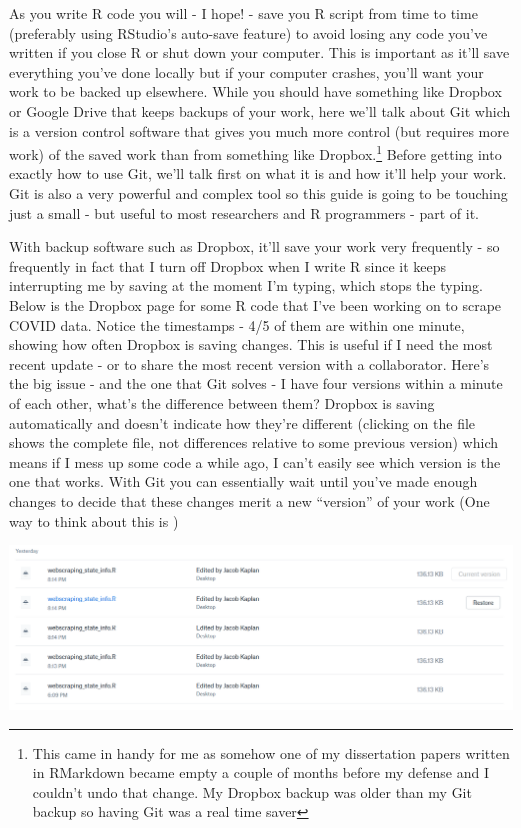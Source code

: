\documentclass[
  12pt,
]{book}
\begin{document}
As you write R code you will - I hope! - save you R script from time to time (preferably using RStudio's auto-save feature) to avoid losing any code you've written if you close R or shut down your computer. This is important as it'll save everything you've done locally but if your computer crashes, you'll want your work to be backed up elsewhere. While you should have something like Dropbox or Google Drive that keeps backups of your work, here we'll talk about Git which is a version control software that gives you much more control (but requires more work) of the saved work than from something like Dropbox.\footnote{This came in handy for me as somehow one of my dissertation papers written in RMarkdown became empty a couple of months before my defense and I couldn't undo that change. My Dropbox backup was older than my Git backup so having Git was a real time saver} Before getting into exactly how to use Git, we'll talk first on what it is and how it'll help your work. Git is also a very powerful and complex tool so this guide is going to be touching just a small - but useful to most researchers and R programmers - part of it.

With backup software such as Dropbox, it'll save your work very frequently - so frequently in fact that I turn off Dropbox when I write R since it keeps interrupting me by saving at the moment I'm typing, which stops the typing. Below is the Dropbox page for some R code that I've been working on to scrape COVID data. Notice the timestamps - 4/5 of them are within one minute, showing how often Dropbox is saving changes. This is useful if I need the most recent update - or to share the most recent version with a collaborator. Here's the big issue - and the one that Git solves - I have four versions within a minute of each other, what's the difference between them? Dropbox is saving automatically and doesn't indicate how they're different (clicking on the file shows the complete file, not differences relative to some previous version) which means if I mess up some code a while ago, I can't easily see which version is the one that works. With Git you can essentially wait until you've made enough changes to decide that these changes merit a new ``version'' of your work (One way to think about this is )

\includegraphics{images/dropbox.png}
\end{document}
